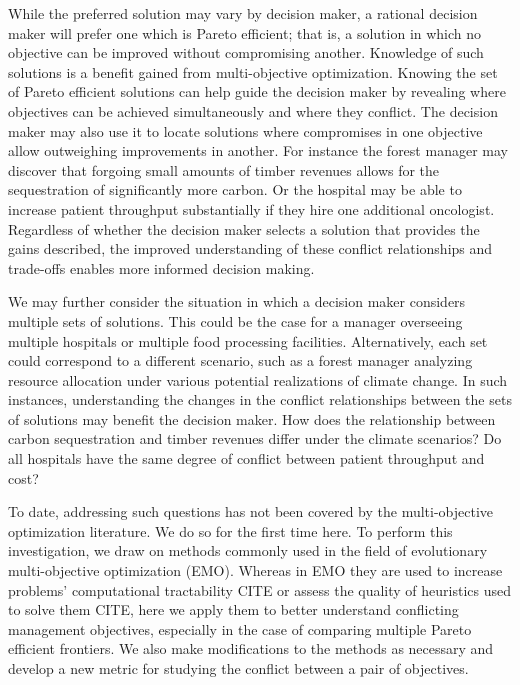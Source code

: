 While the preferred solution may vary by decision maker, a rational decision maker will prefer one which is Pareto efficient; that is, a solution in which no objective can be improved without compromising another. Knowledge of such solutions is a benefit gained from multi-objective optimization. Knowing the set of Pareto efficient solutions can help guide the decision maker by revealing where objectives can be achieved simultaneously and where they conflict. The decision maker may also use it to locate solutions where compromises in one objective allow outweighing improvements in another. For instance the forest manager may discover that forgoing small amounts of timber revenues allows for the sequestration of significantly more carbon. Or the hospital may be able to increase patient throughput substantially if they hire one additional oncologist.
Regardless of whether the decision maker selects a solution that provides the gains described, the improved understanding of these conflict relationships and trade-offs enables more informed decision making.

We may further consider the situation in which a decision maker considers multiple sets of solutions. This could be the case for a manager overseeing multiple hospitals or multiple food processing facilities. Alternatively, each set could correspond to a different scenario, such as a forest manager analyzing resource allocation under various potential realizations of climate change. In such instances, understanding the changes in the conflict relationships between the sets of solutions may benefit the decision maker. How does the relationship between carbon sequestration and timber revenues differ under the climate scenarios? Do all hospitals have the same degree of conflict between patient throughput and cost?

To date, addressing such questions has not been covered by the multi-objective optimization literature. We do so for the first time here. To perform this investigation, we draw on methods commonly used in the field of evolutionary multi-objective optimization (EMO). Whereas in EMO they are used to increase problems' computational tractability CITE or assess the quality of heuristics used to solve them CITE, here we apply them to better understand conflicting management objectives, especially in the case of comparing multiple Pareto efficient frontiers. We also make modifications to the methods as necessary and develop a new metric for studying the conflict between a pair of objectives.

